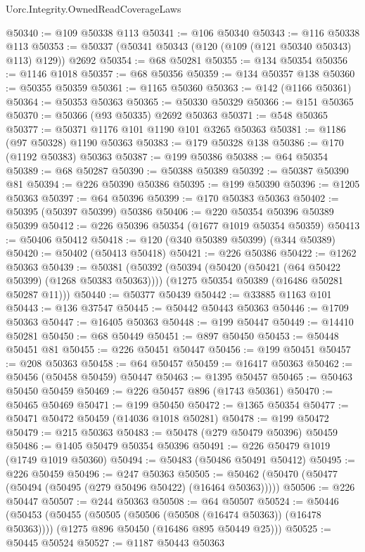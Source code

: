 \begin{lexlean}{Uorc.Integrity.OwnedReadCoverageLaws}
\begin{coremodule}
@50340 := @109 @50338 @113
@50341 := @106 @50340
@50343 := @116 @50338 @113
@50353 := @50337 (@50341 @50343 (@120 (@109 (@121 @50340 @50343) @113) @129)) @2692
@50354 := @68 @50281
@50355 := @134 @50354
@50356 := @1146 @1018
@50357 := @68 @50356
@50359 := @134 @50357 @138
@50360 := @50355 @50359
@50361 := @1165 @50360
@50363 := @142 (@1166 @50361)
@50364 := @50353 @50363
@50365 := @50330 @50329
@50366 := @151 @50365
@50370 := @50366 (@93 @50335) @2692 @50363
@50371 := @548 @50365
@50377 := @50371 @1176 @101 @1190 @101 @3265 @50363
@50381 := @1186 (@97 @50328) @1190 @50363
@50383 := @179 @50328 @138
@50386 := @170 (@1192 @50383) @50363
@50387 := @199 @50386
@50388 := @64 @50354
@50389 := @68 @50287
@50390 := @50388 @50389
@50392 := @50387 @50390 @81
@50394 := @226 @50390 @50386
@50395 := @199 @50390
@50396 := @1205 @50363
@50397 := @64 @50396
@50399 := @170 @50383 @50363
@50402 := @50395 (@50397 @50399) @50386
@50406 := @220 @50354 @50396 @50389 @50399
@50412 := @226 @50396 @50354 (@1677 @1019 @50354 @50359)
@50413 := @50406 @50412
@50418 := @120 (@340 @50389 @50399) (@344 @50389)
@50420 := @50402 (@50413 @50418)
@50421 := @226 @50386
@50422 := @1262 @50363
@50439 := @50381
    (@50392
      (@50394 (@50420 (@50421 (@64 @50422 @50399) (@1268 @50383 @50363))))
      (@1275 @50354 @50389 (@16486 @50281 @50287 @11)))
@50440 := @50377 @50439
@50442 := @33885 @1163 @101
@50443 := @136 @37547
@50445 := @50442 @50443 @50363
@50446 := @1709 @50363
@50447 := @16405 @50363
@50448 := @199 @50447
@50449 := @14410 @50281
@50450 := @68 @50449
@50451 := @897 @50450
@50453 := @50448 @50451 @81
@50455 := @226 @50451 @50447
@50456 := @199 @50451
@50457 := @208 @50363
@50458 := @64 @50457
@50459 := @16417 @50363
@50462 := @50456 (@50458 @50459) @50447
@50463 := @1395 @50457
@50465 := @50463 @50450 @50459
@50469 := @226 @50457 @896 (@1743 @50361)
@50470 := @50465 @50469
@50471 := @199 @50450
@50472 := @1365 @50354
@50477 := @50471 @50472 @50459 (@14036 @1018 @50281)
@50478 := @199 @50472
@50479 := @215 @50363
@50483 := @50478 (@279 @50479 @50396) @50459
@50486 := @1405 @50479 @50354 @50396
@50491 := @226 @50479 @1019 (@1749 @1019 @50360)
@50494 := @50483 (@50486 @50491 @50412)
@50495 := @226 @50459
@50496 := @247 @50363
@50505 := @50462 (@50470 (@50477 (@50494 (@50495 (@279 @50496 @50422) (@16464 @50363)))))
@50506 := @226 @50447
@50507 := @244 @50363
@50508 := @64 @50507
@50524 := @50446
    (@50453
      (@50455 (@50505 (@50506 (@50508 (@16474 @50363)) (@16478 @50363))))
      (@1275 @896 @50450 (@16486 @895 @50449 @25)))
@50525 := @50445 @50524
@50527 := @1187 @50443 @50363

\end{coremodule}
\end{lexlean}
